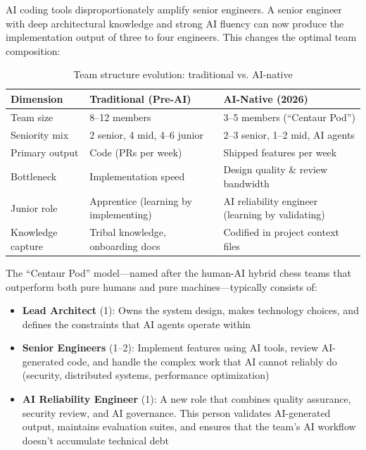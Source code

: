 AI coding tools disproportionately amplify senior engineers. A senior engineer with deep architectural knowledge and strong AI fluency can now produce the implementation output of three to four engineers. This changes the optimal team composition:

\begin{table}[htbp]
\centering
\caption{Team structure evolution: traditional vs. AI-native}
\label{tab:team-evolution}
\begin{tabularx}{\textwidth}{lXX}
\toprule
\textbf{Dimension} & \textbf{Traditional (Pre-AI)} & \textbf{AI-Native (2026)} \\
\midrule
Team size & 8--12 members & 3--5 members (``Centaur Pod'') \\
Seniority mix & 2 senior, 4 mid, 4--6 junior & 2--3 senior, 1--2 mid, AI agents \\
Primary output & Code (PRs per week) & Shipped features per week \\
Bottleneck & Implementation speed & Design quality \& review bandwidth \\
Junior role & Apprentice (learning by implementing) & AI reliability engineer (learning by validating) \\
Knowledge capture & Tribal knowledge, onboarding docs & Codified in project context files \\
\bottomrule
\end{tabularx}
\end{table}

The ``Centaur Pod'' model---named after the human-AI hybrid chess teams that outperform both pure humans and pure machines---typically consists of:

\begin{itemize}[leftmargin=*]
    \item \textbf{Lead Architect} (1): Owns the system design, makes technology choices, and defines the constraints that AI agents operate within
    \item \textbf{Senior Engineers} (1--2): Implement features using AI tools, review AI-generated code, and handle the complex work that AI cannot reliably do (security, distributed systems, performance optimization)
    \item \textbf{AI Reliability Engineer} (1): A new role that combines quality assurance, security review, and AI governance. This person validates AI-generated output, maintains evaluation suites, and ensures that the team's AI workflow doesn't accumulate technical debt
\end{itemize}

